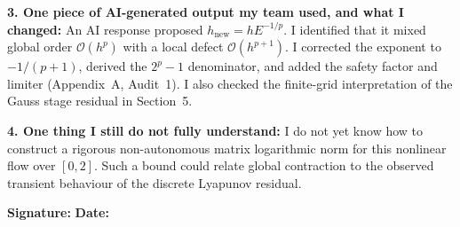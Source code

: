 \documentclass[10pt,a4paper]{article}
\begin{document}
\begin{formbox}
\textbf{3. One piece of AI-generated output my team used, and what I changed:}
An AI response proposed $h_{\mathrm{new}}=hE^{-1/p}$. I identified that it
mixed global order $\mathcal{O}(h^p)$ with a local defect
$\mathcal{O}(h^{p+1})$. I corrected the exponent to $-1/(p+1)$, derived the
$2^p-1$ denominator, and added the safety factor and limiter (Appendix~A,
Audit~1). I also checked the finite-grid interpretation of the Gauss stage
residual in Section~5.

\textbf{4. One thing I still do not fully understand:}
I do not yet know how to construct a rigorous non-autonomous matrix logarithmic
norm for this nonlinear flow over $[0,2]$. Such a bound could relate global
contraction to the observed transient behaviour of the discrete Lyapunov
residual.

\textbf{Signature:} \underline{\hspace{4.5cm}} \hfill
\textbf{Date:} \underline{\hspace{2.5cm}}
\end{formbox}
\end{document}
